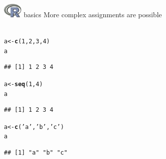 \documentclass[xcolor=svgnames]{beamer}\usepackage[]{graphicx}\usepackage[]{color}
\makeatletter
\newcommand{\hlnum}[1]{\textcolor[rgb]{0.686,0.059,0.569}{#1}}%
\newcommand{\hlstr}[1]{\textcolor[rgb]{0.192,0.494,0.8}{#1}}%
\newcommand{\hlstd}[1]{\textcolor[rgb]{0.345,0.345,0.345}{#1}}%
\newcommand{\hlkwb}[1]{\textcolor[rgb]{0.69,0.353,0.396}{#1}}%
\newcommand{\hlkwd}[1]{\textcolor[rgb]{0.737,0.353,0.396}{\textbf{#1}}}%
\newenvironment{kframe}{%
 \def\at@end@of@kframe{}%
 \ifinner\ifhmode%
  \def\at@end@of@kframe{\end{minipage}}%
  \begin{minipage}{\columnwidth}%
 \fi\fi%
 \def\FrameCommand##1{\hskip\@totalleftmargin \hskip-\fboxsep
 \colorbox{shadecolor}{##1}\hskip-\fboxsep
     \hskip-\linewidth \hskip-\@totalleftmargin \hskip\columnwidth}%
 \MakeFramed {\advance\hsize-\width
   \@totalleftmargin\z@ \linewidth\hsize
   \@setminipage}}%
 {\par\unskip\endMakeFramed%
 \at@end@of@kframe}
\newenvironment{knitrout}{}{} %
\makeatother
\begin{document}
\begin{frame}[t,fragile]{\includegraphics[width=0.07\textwidth]{Rlogo.jpg} \hspace{0.01in} basics}
More complex assignments are possible\\~\\
\begin{knitrout}\scriptsize
{}\color{fgcolor}\begin{kframe}
\begin{alltt}
\hlstd{a} \hlkwb{<-} \hlkwd{c}\hlstd{(}\hlnum{1}\hlstd{,} \hlnum{2}\hlstd{,} \hlnum{3} \hlstd{,} \hlnum{4}\hlstd{)}
\hlstd{a}
\end{alltt}
\begin{verbatim}
## [1] 1 2 3 4
\end{verbatim}
\begin{alltt}
\hlstd{a} \hlkwb{<-} \hlkwd{seq}\hlstd{(}\hlnum{1}\hlstd{,} \hlnum{4}\hlstd{)}
\hlstd{a}
\end{alltt}
\begin{verbatim}
## [1] 1 2 3 4
\end{verbatim}
\begin{alltt}
\hlstd{a} \hlkwb{<-} \hlkwd{c}\hlstd{(}\hlstr{'a'}\hlstd{,} \hlstr{'b'}\hlstd{,} \hlstr{'c'}\hlstd{)}
\hlstd{a}
\end{alltt}
\begin{verbatim}
## [1] "a" "b" "c"
\end{verbatim}
\end{kframe}
\end{knitrout}
\end{frame}
\end{document}
